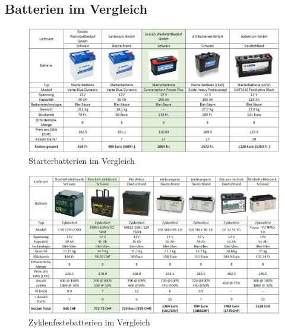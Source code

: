 	\begin{landscape}
		\section{Batterien im Vergleich}\label{appsec:Batterie}
		\begin{figure}[H]
			\begin{center}
				\includegraphics[width=210mm]{appendix/BatterieStart.png}
				\caption[Starterbatterien im Vergleich]{Starterbatterien im Vergleich} %
				\label{fig:Starterbatterie}
			\end{center}
		\end{figure}
		
		\begin{figure}[H]
			\begin{center}
				\includegraphics[width=210mm]{appendix/BatterieZyklenfest.png}
				\caption[Zyklenfestebatterien]{Zyklenfestebatterien im Vergleich} %
				\label{fig:Zyklenfestebatterie}
			\end{center}
		\end{figure}
	\end{landscape}
